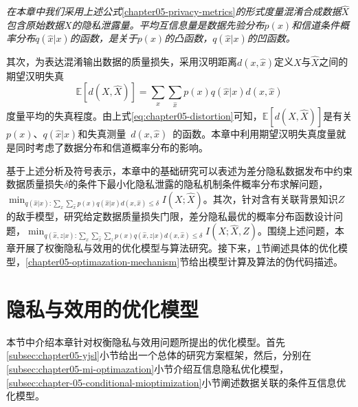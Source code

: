 \begin{remark}{\em
在本章中我们采用上述公式}\ref{chapter05-privacy-metrics}{\em 的形式度量混淆合成数据$\hat{X}$包含原始数据$X$的隐私泄露量。平均互信息量是数据先验分布$p(x)$和信道条件概率分布$q(\hat{x}|x)$的函数，是关于$p(x)$的凸函数，$q(\hat{x}|x)$的凹函数。}
\end{remark}

其次，为表达混淆输出数据的质量损失，采用汉明距离$d(x,\hat{x})$定义$X$与$\hat{X}$之间的期望汉明失真
\begin{equation}\label{eq:chapter05-distortion}
	\mathbb{E}\left[d\left(X,\hat{X}\right)\right]=\sum_{x}\sum_{\hat{x}}p(x)q(\hat{x}|x)d(x,\hat{x})
\end{equation}
度量平均的失真程度。由上式\ref{eq:chapter05-distortion}可知，$	\mathbb{E}\left[d\left(X,\hat{X}\right)\right]$是有关$p(x)$、$q(\hat{x}|x)$和失真测量~$d(x,\hat{x})$~的函数。本章中利用期望汉明失真度量就是同时考虑了数据分布和信道概率分布的影响。

基于上述分析及符号表示，本章中的基础研究可以表述为差分隐私数据发布中约束数据质量损失$\delta$的条件下最小化隐私泄露的隐私机制条件概率分布求解问题，$\min_{q(\hat{x}|x):\sum_{x}\sum_{\hat{x}}p(x)q(\hat{x}|x)d(x,\hat{x})\leq \delta}I(X;\hat{X})$。其次，针对含有关联背景知识$Z$的敌手模型，研究给定数据质量损失门限，差分隐私最优的概率分布函数设计问题，$\min_{q(\hat{x},z|x):\sum_{x}\sum_{\hat{x}}\sum_{z}p(x)q(\hat{x},z|x)d(x,\hat{x})\leq  \delta}I(X;\hat{X},Z)$。围绕上述问题，本章开展了权衡隐私与效用的优化模型与算法研究。接下来，\ref{chapter05-optimal-model}节阐述具体的优化模型，\ref{chapter05-optimazation-mechanism}节给出模型计算及算法的伪代码描述。

\section{隐私与效用的优化模型}\label{chapter05-optimal-model}
本节中介绍本章针对权衡隐私与效用问题所提出的优化模型。首先\ref{subsec:chapter05-yjsl}小节给出一个总体的研究方案框架，然后，分别在\ref{subsec:chapter05-mi-optimazation}小节介绍互信息隐私优化模型，\ref{subsec:chapter-05-conditional-mioptimization}小节阐述数据关联的条件互信息优化模型。

